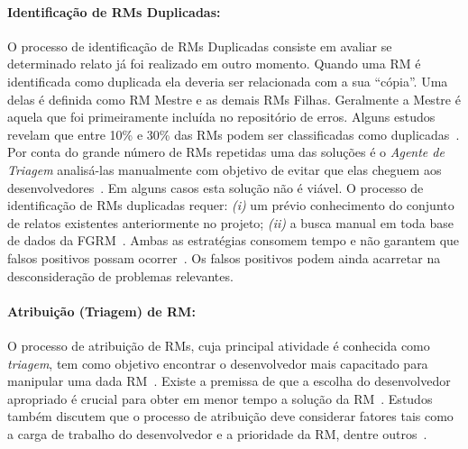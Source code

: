 
\paragraph{Identificação de RMs Duplicadas:}

O processo de identificação de RMs Duplicadas consiste em avaliar se determinado
relato já foi realizado em outro momento. Quando uma RM é identificada como
duplicada ela deveria ser relacionada com a sua ``cópia''. Uma delas é definida
como RM Mestre e as demais RMs Filhas. Geralmente a Mestre é aquela que foi
primeiramente incluída no repositório de erros. Alguns estudos revelam que entre
10\% e 30\% das RMs podem ser classificadas como
duplicadas~\cite{anvik2005coping,cavalcanti2013bug,Runeson:2007:DDD:1248820.1248882}.
Por conta do grande número de RMs repetidas uma das soluções é o \textit{Agente
    de Triagem} analisá-las manualmente com objetivo de evitar que elas cheguem
aos desenvolvedores~\cite{anvik2005coping}. Em alguns casos esta solução não é
viável. O processo de identificação de RMs duplicadas requer: \textit{(i)} um
prévio conhecimento do conjunto de relatos existentes anteriormente no projeto;
\textit{(ii)} a busca manual em toda base de dados da
FGRM~\cite{banerjee2012automated,
    Lerch:2013:FDY:2495256.2495763,hindle2016contextual}. Ambas as estratégias
consomem tempo e não garantem que falsos positivos possam
ocorrer~\cite{kaushik2012comparative}. Os falsos positivos podem ainda acarretar
na desconsideração de problemas relevantes.

\paragraph{Atribuição (Triagem) de RM:}

O processo de atribuição de RMs, cuja principal atividade é conhecida como
\textit{triagem}, tem como objetivo encontrar o desenvolvedor mais capacitado
para manipular uma dada RM~\cite{cavalcanti2014challenges}. Existe a premissa de
que a escolha do desenvolvedor apropriado é crucial para obter em menor tempo a
so\-lu\-ção da RM~\cite{di2002approach}. Estudos também discutem que o processo
de atribuição deve considerar fatores tais como a carga de trabalho do
desenvolvedor e a prioridade da RM, dentre outros~\cite{aljarah2011selecting}.

